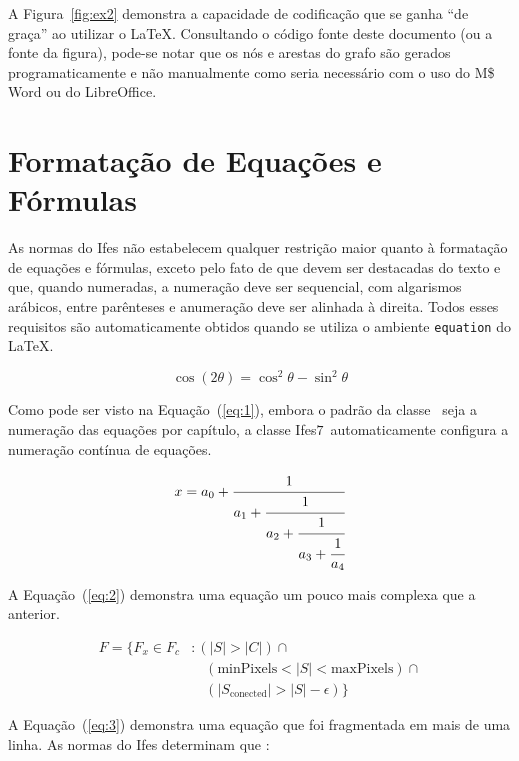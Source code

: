 \documentclass[times,english,brazil,oneside]{ifes7}
\newcommand{\ifestex}{\textsf{Ifes$7$}}
\begin{document}
A Figura~\ref{fig:ex2} demonstra a capacidade de codificação que se
ganha ``de graça'' ao utilizar o \LaTeX. Consultando o código fonte
deste documento (ou a fonte da figura), pode-se notar que os nós e
arestas do grafo são gerados programaticamente e não manualmente como
seria necessário com o uso do M\$ Word ou do LibreOffice.


\section{Formatação de Equações e Fórmulas}
\label{sec:format-equac}

As normas do Ifes não estabelecem qualquer restrição maior quanto à
formatação de equações e fórmulas, exceto pelo fato de que devem ser
destacadas do texto e que, quando numeradas, a numeração deve ser
sequencial, com algarismos arábicos, entre parênteses e anumeração
deve ser alinhada à direita. Todos esses requisitos são
automaticamente obtidos quando se utiliza o ambiente \texttt{equation}
do \LaTeX.

\begin{equation}
  \label{eq:1}
  \cos (2\theta) = \cos^2 \theta - \sin^2 \theta
\end{equation}

Como pode ser visto na Equação~(\ref{eq:1}), embora o padrão da classe
\abnTeX\ seja a numeração das equações por capítulo, a classe
\ifestex\ automaticamente configura a numeração contínua de equações.

\begin{equation}
  \label{eq:2}
  x = a_0 + \cfrac{1}{a_1 
    + \cfrac{1}{a_2 
      + \cfrac{1}{a_3 + \cfrac{1}{a_4}}}}
\end{equation}

A Equação~(\ref{eq:2}) demonstra uma equação um pouco mais complexa
que a anterior.

\begin{equation}
  \label{eq:3}
  \begin{split}
    F = \{F_{x} \in  F_{c} &: (|S| > |C|) \cap {}\\
    &\quad (\text{minPixels}  < |S| < \text{maxPixels}) \cap {} \\
    &\quad (|S_{\text{conected}}| > |S| - \epsilon) \}
  \end{split}
\end{equation}

A Equação~(\ref{eq:3}) demonstra uma equação que foi fragmentada em
mais de uma linha. As normas do Ifes determinam que
\cite[p.~38]{Ifes2014}:
\end{document}
